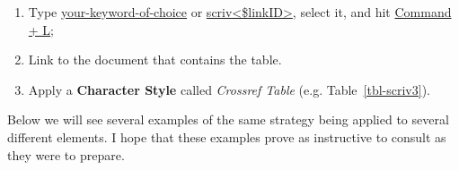 \documentclass[
  12pt,
  a4paper,
  oneside,
  numbers=noenddot,
  titlepage,
  toclink=all,
  toc=bibliography]{scrbook}
\providecommand{\tightlist}{%
  \setlength{\itemsep}{0pt}\setlength{\parskip}{0pt}}
\theoremstyle{definition}
\theoremstyle{definition}
\theoremstyle{definition}
\theoremstyle{plain}
\theoremstyle{plain}
\theoremstyle{plain}
\theoremstyle{plain}
\theoremstyle{plain}
\theoremstyle{remark}
\begin{document}
\begin{tcolorbox}[enhanced jigsaw, rightrule=.15mm, bottomtitle=1mm, colback=white, toptitle=1mm, left=2mm, colbacktitle=quarto-callout-tip-color!10!white, opacitybacktitle=0.6, opacityback=0, arc=.35mm, leftrule=.75mm, toprule=.15mm, titlerule=0mm, breakable, coltitle=black, bottomrule=.15mm, colframe=quarto-callout-tip-color-frame, title=\textcolor{quarto-callout-tip-color}{\faLightbulb}\hspace{0.5em}{Cross-referencing a table}]

\begin{enumerate}
\def\labelenumi{\arabic{enumi}.}
\tightlist
\item
  Type \ul{your-keyword-of-choice} or
  \ul{scriv\textless\$linkID\textgreater{}}, select it, and hit
  \ul{Command + L};
\item
  Link to the document that contains the table.
\item
  Apply a \textbf{Character Style} called \emph{Crossref Table} (e.g.
  \protect\hypertarget{cite_8}{}{\label{cite_8}Table~\ref{tbl-scriv3}}).
\end{enumerate}

\end{tcolorbox}

Below we will see several examples of the same strategy being applied to
several different elements. I hope that these examples prove as
instructive to consult as they were to prepare.
\end{document}

